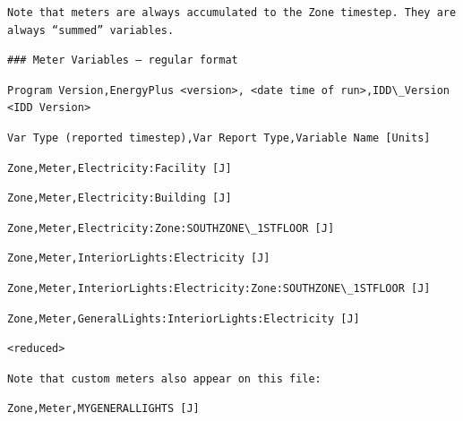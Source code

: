 \begin{lstlisting}
Note that meters are always accumulated to the Zone timestep. They are always “summed” variables.
\end{lstlisting}

\begin{lstlisting}
### Meter Variables – regular format
\end{lstlisting}

\begin{lstlisting}
Program Version,EnergyPlus <version>, <date time of run>,IDD\_Version <IDD Version>
\end{lstlisting}

\begin{lstlisting}
Var Type (reported timestep),Var Report Type,Variable Name [Units]
\end{lstlisting}

\begin{lstlisting}
Zone,Meter,Electricity:Facility [J]
\end{lstlisting}

\begin{lstlisting}
Zone,Meter,Electricity:Building [J]
\end{lstlisting}

\begin{lstlisting}
Zone,Meter,Electricity:Zone:SOUTHZONE\_1STFLOOR [J]
\end{lstlisting}

\begin{lstlisting}
Zone,Meter,InteriorLights:Electricity [J]
\end{lstlisting}

\begin{lstlisting}
Zone,Meter,InteriorLights:Electricity:Zone:SOUTHZONE\_1STFLOOR [J]
\end{lstlisting}

\begin{lstlisting}
Zone,Meter,GeneralLights:InteriorLights:Electricity [J]
\end{lstlisting}

\begin{lstlisting}
<reduced>
\end{lstlisting}

\begin{lstlisting}
Note that custom meters also appear on this file:
\end{lstlisting}

\begin{lstlisting}
Zone,Meter,MYGENERALLIGHTS [J]
\end{lstlisting}

